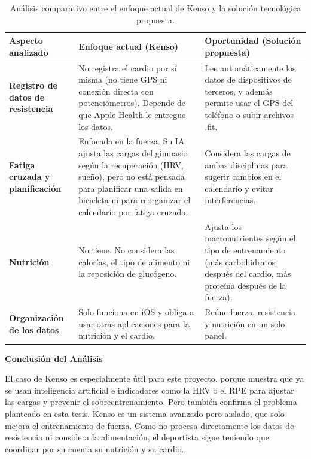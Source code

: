 \begin{table}[h!]
    \centering
    \renewcommand{\arraystretch}{1.5}
    \begin{tabular}{|m{3.5cm}|m{5.5cm}|m{5.5cm}|}
        \hline
        \rowcolor[HTML]{EFEFEF}
        \textbf{Aspecto analizado} & \textbf{Enfoque actual (Kenso)} & \textbf{Oportunidad (Solución propuesta)} \\ \hline
        \textbf{Registro de datos de resistencia} & No registra el cardio por sí misma (no tiene GPS ni conexión directa con potenciómetros). Depende de que Apple Health le entregue los datos. & Lee automáticamente los datos de dispositivos de terceros, y además permite usar el GPS del teléfono o subir archivos .fit. \\ \hline
        \textbf{Fatiga cruzada y planificación} & Enfocada en la fuerza. Su IA ajusta las cargas del gimnasio según la recuperación (HRV, sueño), pero no está pensada para planificar una salida en bicicleta ni para reorganizar el calendario por fatiga cruzada. & Considera las cargas de ambas disciplinas para sugerir cambios en el calendario y evitar interferencias. \\ \hline
        \textbf{Nutrición} & No tiene. No considera las calorías, el tipo de alimento ni la reposición de glucógeno. & Ajusta los macronutrientes según el tipo de entrenamiento (más carbohidratos después del cardio, más proteína después de la fuerza). \\ \hline
        \textbf{Organización de los datos} & Solo funciona en iOS y obliga a usar otras aplicaciones para la nutrición y el cardio. & Reúne fuerza, resistencia y nutrición en un solo panel. \\ \hline
    \end{tabular}
    \caption{Análisis comparativo entre el enfoque actual de Kenso y la solución tecnológica propuesta.}
    \label{tab:analisis_kenso}
\end{table}

\textbf{Conclusión del Análisis}

El caso de Kenso es especialmente útil para este proyecto, porque muestra que ya se usan inteligencia artificial e indicadores como la HRV o el RPE para ajustar las cargas y prevenir el sobreentrenamiento. Pero también confirma el problema planteado en esta tesis. Kenso es un sistema avanzado pero aislado, que solo mejora el entrenamiento de fuerza. Como no procesa directamente los datos de resistencia ni considera la alimentación, el deportista sigue teniendo que coordinar por su cuenta su nutrición y su cardio.

